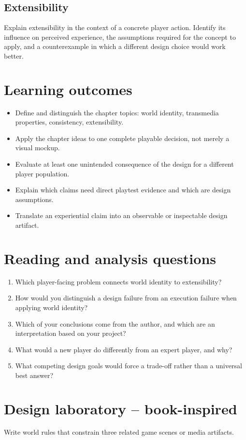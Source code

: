 \documentclass[11pt]{article}
\begin{document}
\subsection{Extensibility}
Explain extensibility in the context of a concrete player action. Identify its influence on perceived experience, the assumptions required for the concept to apply, and a counterexample in which a different design choice would work better.


\section{Learning outcomes}
\begin{itemize}
\item Define and distinguish the chapter topics: world identity, transmedia properties, consistency, extensibility.
\item Apply the chapter ideas to one complete playable decision, not merely a visual mockup.
\item Evaluate at least one unintended consequence of the design for a different player population.
\item Explain which claims need direct playtest evidence and which are design assumptions.
\item Translate an experiential claim into an observable or inspectable design artifact.
\end{itemize}

\section{Reading and analysis questions}
\begin{enumerate}
\item Which player-facing problem connects world identity to extensibility?
\item How would you distinguish a design failure from an execution failure when applying world identity?
\item Which of your conclusions come from the author, and which are an interpretation based on your project?
\item What would a new player do differently from an expert player, and why?
\item What competing design goals would force a trade-off rather than a universal best answer?
\end{enumerate}

\section{Design laboratory -- book-inspired}
Write world rules that constrain three related game scenes or media artifacts.
\end{document}
